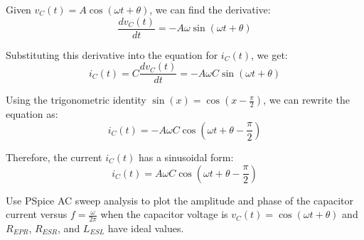 \documentclass[11pt]{article}
\begin{document}
\begin{question}
\begin{subquestion}
{            Given \( v_C(t) = A \cos(\omega t + \theta) \), we can find the derivative:
            \[
                \frac{d v_C(t)}{dt} = -A \omega \sin(\omega t + \theta)
            \]

            Substituting this derivative into the equation for \( i_C(t) \), we get:
            \[
                i_C(t) = C \frac{d v_C(t)}{dt} = -A \omega C \sin(\omega t + \theta)
            \]

            Using the trigonometric identity \( \sin(x) = \cos(x - \frac{\pi}{2}) \), we can rewrite the equation as:
            \[
                i_C(t) = -A \omega C \cos\left(\omega t + \theta - \frac{\pi}{2}\right)
            \]

            Therefore, the current \( i_C(t) \) has a sinusoidal form:
            \[
                i_C(t) = A \omega C \cos\left(\omega t + \theta - \frac{\pi}{2}\right)
            \]

        }
    \end{subquestion}

    \begin{subquestion}{Use PSpice AC sweep analysis to plot the amplitude and phase of the capacitor current versus $f=\frac{\omega}{2\pi}$ when the capacitor voltage is $v_C(t)=\cos(\omega t+\theta)$ and $R_{EPR}$, $R_{ESR}$, and $L_{ESL}$ have ideal values.}
\end{subquestion}
\end{question}
\end{document}
